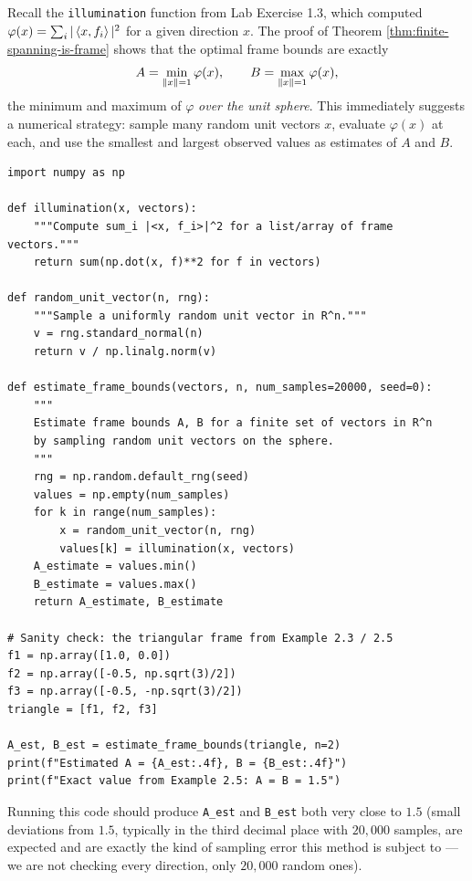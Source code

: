 Recall the \texttt{illumination} function from Lab Exercise 1.3, which computed $\varphi(x) = \sum_i |\left\langle x, f_i \right\rangle|^2$ for a given direction $x$. The proof of Theorem \ref{thm:finite-spanning-is-frame} shows that the optimal frame bounds are exactly
$$
A = \min_{\left\| x \right\|=1} \varphi(x), \qquad B = \max_{\left\| x \right\|=1} \varphi(x),
$$
the minimum and maximum of $\varphi$ \emph{over the unit sphere}. This immediately suggests a numerical strategy: sample many random unit vectors $x$, evaluate $\varphi(x)$ at each, and use the smallest and largest observed values as estimates of $A$ and $B$.

\begin{lstlisting}[caption={Estimating frame bounds by random sampling on the unit sphere}]
import numpy as np

def illumination(x, vectors):
    """Compute sum_i |<x, f_i>|^2 for a list/array of frame vectors."""
    return sum(np.dot(x, f)**2 for f in vectors)

def random_unit_vector(n, rng):
    """Sample a uniformly random unit vector in R^n."""
    v = rng.standard_normal(n)
    return v / np.linalg.norm(v)

def estimate_frame_bounds(vectors, n, num_samples=20000, seed=0):
    """
    Estimate frame bounds A, B for a finite set of vectors in R^n
    by sampling random unit vectors on the sphere.
    """
    rng = np.random.default_rng(seed)
    values = np.empty(num_samples)
    for k in range(num_samples):
        x = random_unit_vector(n, rng)
        values[k] = illumination(x, vectors)
    A_estimate = values.min()
    B_estimate = values.max()
    return A_estimate, B_estimate

# Sanity check: the triangular frame from Example 2.3 / 2.5
f1 = np.array([1.0, 0.0])
f2 = np.array([-0.5, np.sqrt(3)/2])
f3 = np.array([-0.5, -np.sqrt(3)/2])
triangle = [f1, f2, f3]

A_est, B_est = estimate_frame_bounds(triangle, n=2)
print(f"Estimated A = {A_est:.4f}, B = {B_est:.4f}")
print(f"Exact value from Example 2.5: A = B = 1.5")
\end{lstlisting}

Running this code should produce \texttt{A\_est} and \texttt{B\_est} both very close to $1.5$ (small deviations from $1.5$, typically in the third decimal place with $20{,}000$ samples, are expected and are exactly the kind of sampling error this method is subject to --- we are not checking every direction, only $20{,}000$ random ones).

